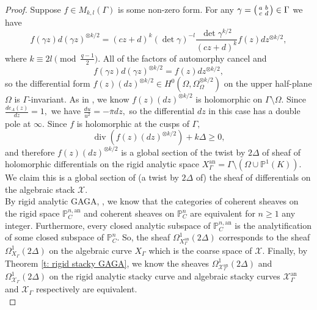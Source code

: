 \documentclass[11pt]{amsart}
\theoremstyle{definition}
\newenvironment{psmallmatrix}
{\left(\begin{smallmatrix}}
	{\end{smallmatrix}\right)}
\numberwithin{equation}{section}
\newcommand{\sX}{\mathscr{X}}		%
\newcommand{\bbP}{\mathbb{P}}		%
\begin{document}
		\begin{proof}
			Suppose $f\in M_{k,l}(\Gamma)$ is some non-zero form. For any $\displaystyle{\gamma=\begin{psmallmatrix}a&b\\c&d\end{psmallmatrix}\in \Gamma}$ we have \[
			f(\gamma z)d(\gamma z)^{\otimes k/2}= (cz+d)^k(\det\gamma)^{-l}\frac{\det\gamma^{k/2}}{(cz+d)^k} f(z)dz^{\otimes k/2},\] 
			where $k\equiv 2l\pmod{\frac{q-1}{2}}.$ All of the factors of automorphy cancel and \[f(\gamma z)d(\gamma z)^{\otimes k/2}=f(z)dz^{\otimes k/2},\] so the differential form $f(z)(dz)^{\otimes k/2}\in H^0(\Omega,\Omega_{\Omega}^{\otimes k/2})$ on the upper half-plane $\Omega$ is $\Gamma$-invariant. As in \cite[Section $(2.10)$]{Gekeler-jacobians}, we know $f(z)(dz)^{\otimes k/2}$ is holomorphic on $\Gamma\setminus \Omega.$
			Since $\displaystyle{\frac{de_A(z)}{dz}=1},$ we have 
			$\displaystyle{\frac{du}{u^2} = -\overline{\pi}dz,}$ so the differential $dz$ in this case has a double pole at $\infty.$
			Since $f$ is holomorphic at the cusps of $\Gamma,$ 
			\[\operatorname{div}(f(z)(dz)^{\otimes k/2}) +k\Delta\geq 0,\]
			and therefore $f(z)(dz)^{\otimes k/2}$ is a global section of the twist by $2\Delta$ of sheaf of holomorphic differentials on the rigid analytic space $X_{\Gamma}^{\text{an}}=\Gamma\setminus(\Omega\cup\bbP^1(K)).$
			We claim this is a global section of (a twist by $2\Delta$ of) the sheaf of differentials on the algebraic stack $\sX.$\\
			
			By rigid analytic GAGA, \cite[Theorem $4.10.5$]{Frensel-vanderPut-Rigid-Analytic_Geom}, we know that the categories of coherent sheaves on the rigid space $\bbP^{n,\text{an}}_C$ and coherent sheaves on $\bbP^n_C$ are equivalent for $n\geq 1$ any integer. Furthermore, every closed analytic subspace of $\bbP^{n,\text{an}}_C$ is the analytification of some closed subspace of $\bbP^n_C.$ So, the sheaf $\Omega_{X_{\Gamma}^{\text{an}}}^1(2\Delta)$ corresponds to the sheaf $\Omega^1_{X_{\Gamma}}(2\Delta)$ on the algebraic curve $X_{\Gamma}$ which is the coarse space of $\sX.$ Finally, by 
			Theorem \ref{t: rigid stacky GAGA}, we know the sheaves $\Omega_{\sX_{\Gamma}^{\text{an}}}^1(2\Delta)$ and $\Omega^1_{\sX_{\Gamma}}(2\Delta)$ on the rigid analytic stacky curve and algebraic stacky curves $\sX_{\Gamma}^{\text{an}}$ and $\sX_{\Gamma}$ respectively are equivalent.\\ 
			

\end{proof}
\end{document}
